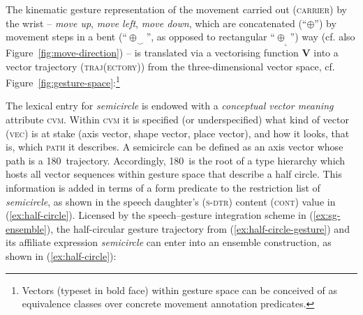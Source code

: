 \documentclass[output=paper,biblatex,babelshorthands,newtxmath,draftmode,colorlinks,citecolor=brown]{langscibook}
\begin{document}
\largerpage
The kinematic gesture representation of the movement carried out (\textsc{carrier}) 
by the wrist  -- \textit{move up}, \textit{move left}, \textit{move down}, which
are concatenated (``$\oplus$'') by movement steps in a bent
(\enquote{\ensuremath{\oplus_\smallsmile}}, as opposed to rectangular
\enquote{\ensuremath{\oplus_\llcorner}}) way (cf. also Figure~\ref{fig:move-direction}) -- is
translated via a vectorising function \textbf{V} into a vector trajectory (\textsc{traj(ectory)})
 from the three-dimensional vector space,
cf. Figure~\ref{fig:gesture-space}:\footnote{Vectors (typeset in bold face) within gesture space can
  be conceived of as equivalence classes over concrete movement annotation predicates.} 


\ea \label{ex:half-circle-gesture}
\z
%
The lexical entry for \textit{semicircle} is endowed with a \emph{conceptual vector meaning} attribute \textsc{cvm}.
%
Within \textsc{cvm} it is specified (or underspecified) what kind of vector (\textsc{vec})  is at stake (axis vector, shape vector, place vector), and how it looks, that is, which \textsc{path}  it describes.
%
A semicircle can be defined as an axis vector whose path is a 180\textdegree\ trajectory.
%
Accordingly, 180\textdegree\ is the root of a type hierarchy which hosts all vector sequences within gesture space that describe a half circle. 
%
This information is added in terms of a form predicate to the restriction list of \textit{semicircle}, as shown in the speech daughter's (\textsc{s-dtr})  content (\textsc{cont}) value in (\ref{ex:half-circle}).
%
Licensed by the speech--gesture integration scheme in (\ref{ex:sg-ensemble}), the half-circular gesture trajectory from (\ref{ex:half-circle-gesture}) and its affiliate expression \textit{semicircle} can enter into an ensemble construction, as shown in (\ref{ex:half-circle}):
\end{document}
